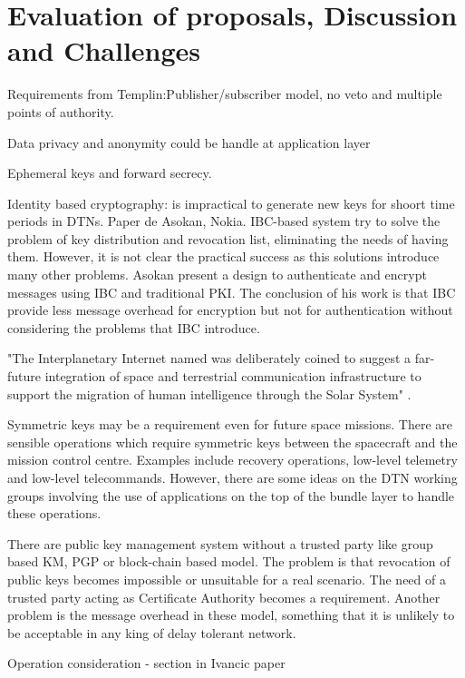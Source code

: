 
\section{Evaluation of proposals, Discussion and Challenges}
\label{sec:evaluation}

Requirements from Templin:Publisher/subscriber model, no veto and multiple points of authority. 

Data privacy and anonymity could be handle at application layer


Ephemeral keys and forward secrecy. 

Identity based cryptography: is impractical to generate new keys for shoort time periods in DTNs.
Paper de Asokan, Nokia. IBC-based system try to solve the problem of key distribution and revocation list, eliminating the needs of having them. However, it is not clear the practical success as this solutions introduce many other problems. Asokan \cite{asokan2007towards} present a design to authenticate and encrypt messages using IBC and traditional PKI. The conclusion of his work is that IBC provide less message overhead for encryption but not for authentication without considering the problems that IBC introduce. 



"The Interplanetary Internet named was deliberately coined to suggest a far-future integration of space and terrestrial communication infrastructure to support the migration of human intelligence through the Solar System" \cite{burleigh2003interplanetary}. 


Symmetric keys may be a requirement even for future space missions. There are sensible operations which require symmetric keys between the spacecraft and the mission control centre. Examples include recovery operations, low-level telemetry and low-level telecommands.  However, there are some ideas on the DTN working groups involving the use of applications on the top of the bundle layer to handle these operations. 

There are public key management system without a trusted party like group based KM, PGP or block-chain based model. The problem is that revocation of public keys becomes impossible or unsuitable for a real scenario. The need of a trusted party acting as Certificate Authority becomes a requirement. Another problem is the message overhead in these model, something that it is unlikely to be acceptable in any king of delay tolerant network. 

Operation consideration - section in Ivancic paper

